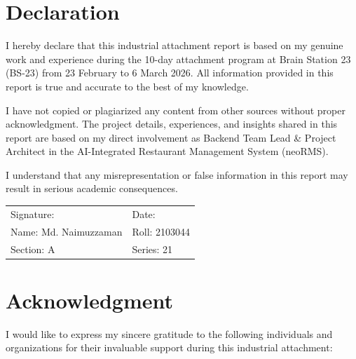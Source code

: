 \documentclass[12pt,a4paper,oneside]{report}
\newcommand{\studentname}{Md. Naimuzzaman}
\newcommand{\studentroll}{2103044}
\newcommand{\studentsection}{A}
\newcommand{\studentseries}{21}
\begin{document}
\chapter*{Declaration}
I hereby declare that this industrial attachment report is based on my genuine work and experience during the 10-day attachment program at Brain Station 23 (BS-23) from 23 February to 6 March 2026. All information provided in this report is true and accurate to the best of my knowledge.

I have not copied or plagiarized any content from other sources without proper acknowledgment. The project details, experiences, and insights shared in this report are based on my direct involvement as Backend Team Lead \& Project Architect in the AI-Integrated Restaurant Management System (neoRMS).

I understand that any misrepresentation or false information in this report may result in serious academic consequences.

\vspace{2cm}
\noindent
\begin{tabular}{@{}p{}p{}@{}}
Signature: \hrulefill & Date: \hrulefill \\
Name: \studentname & Roll: \studentroll \\
Section: \studentsection & Series: \studentseries \\
\end{tabular}

\clearpage

\chapter*{Acknowledgment}
I would like to express my sincere gratitude to the following individuals and organizations for their invaluable support during this industrial attachment:
\end{document}
